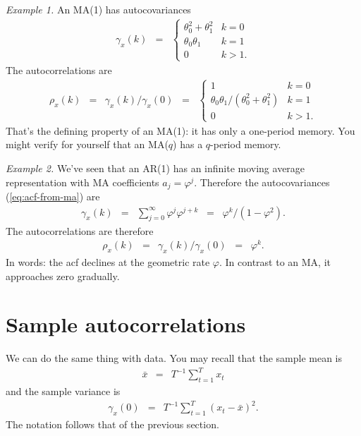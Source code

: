 \documentclass[11pt]{article}
\begin{document}
{\it Example 1.\/}
An MA(1) has autocovariances
\begin{eqnarray*}
    \gamma_x(k) &=&
            \left\{
            \begin{array}{ll}
            \theta_0^2 + \theta_1^2 & k=0 \\
            \theta_0\theta_1  & k=1 \\
            0       &  k > 1 .
            \end{array}
            \right.
\end{eqnarray*}
The autocorrelations are
\begin{eqnarray*}
    \rho_x(k) &=& \gamma_x(k)/\gamma_x(0)
        \;\;=\;\;
            \left\{
            \begin{array}{ll}
            1  & k=0 \\
            \theta_0\theta_1/(\theta_0^2 + \theta_1^2)  & k=1 \\
            0       &  k > 1 .
            \end{array}
            \right.
\end{eqnarray*}
That's the defining property of an MA(1):  %
it has only a one-period memory.
You might verify for yourself that an MA($q$) has a $q$-period memory.

{\it Example 2.\/}
We've seen that an AR(1) has an infinite moving average representation
with MA coefficients $a_j = \varphi^j$.
Therefore the autocovariances (\ref{eq:acf-from-ma}) are
\begin{eqnarray*}
    \gamma_x(k) &=& \sum_{j=0}^\infty \varphi^j \varphi^{j+k}
            \;\;=\;\; \varphi^k/(1-\varphi^2) .
\end{eqnarray*}
The autocorrelations are therefore
\begin{eqnarray*}
    \rho_x(k) &=& \gamma_x(k) / \gamma_x(0)
            \;\;=\;\; \varphi^k .
\end{eqnarray*}
In words:  the acf declines at the geometric rate $\varphi$.
In contrast to an MA, it approaches zero gradually.


\section{Sample autocorrelations}

We can do the same thing with data.
You may recall that the sample mean is
\begin{eqnarray*}
    \bar{x} &=& T^{-1} \sum_{t=1}^T x_{t}
\end{eqnarray*}
and the sample variance is
\begin{eqnarray*}
    \gamma_x(0)  &=&   T^{-1} \sum_{t=1}^T (x_{t}-\bar{x})^2 .
\end{eqnarray*}
The notation follows that of the previous section.
\end{document}
